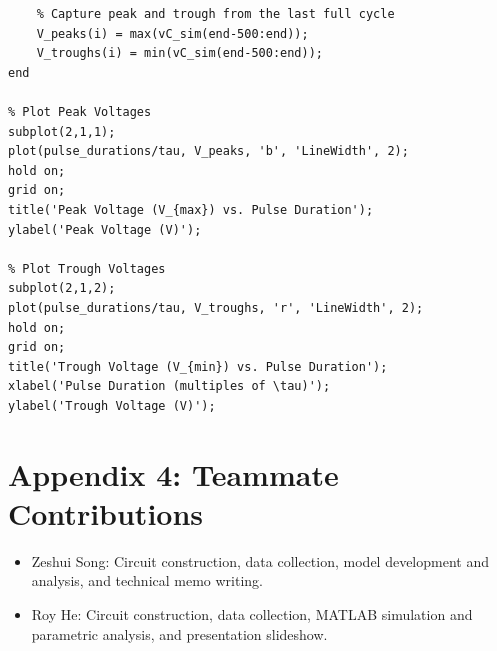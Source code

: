 \documentclass[12pt]{article}
\begin{document}
\begin{verbatim}
    % Capture peak and trough from the last full cycle
    V_peaks(i) = max(vC_sim(end-500:end));
    V_troughs(i) = min(vC_sim(end-500:end));
end

% Plot Peak Voltages
subplot(2,1,1);
plot(pulse_durations/tau, V_peaks, 'b', 'LineWidth', 2);
hold on;
grid on;
title('Peak Voltage (V_{max}) vs. Pulse Duration');
ylabel('Peak Voltage (V)');

% Plot Trough Voltages
subplot(2,1,2);
plot(pulse_durations/tau, V_troughs, 'r', 'LineWidth', 2);
hold on;
grid on;
title('Trough Voltage (V_{min}) vs. Pulse Duration');
xlabel('Pulse Duration (multiples of \tau)');
ylabel('Trough Voltage (V)');
\end{verbatim}
\section*{Appendix 4: Teammate Contributions}
\begin{itemize}
    \item Zeshui Song: Circuit construction, data collection, model development and analysis, and technical memo writing.
    \item Roy He: Circuit construction, data collection, MATLAB simulation and parametric analysis, and presentation slideshow.
\end{itemize}
\end{document}
